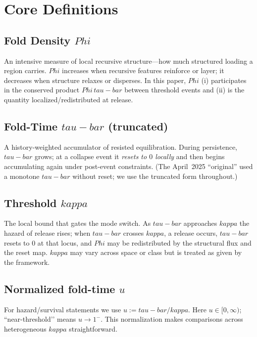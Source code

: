 \documentclass[12pt]{article}
\newcommand{\FoldDensity}{\Phi}
\newcommand{\FoldTime}{\bar{\tau}}
\newcommand{\Threshold}{\kappa}
\def\FoldDensity{Phi}%
\def\FoldTime{tau-bar}%
\def\Threshold{kappa}%
\def\bar#1{#1}%
\begin{document}
\section{Core Definitions}

\subsection[Fold Density (Phi)]{Fold Density $\FoldDensity$}
An intensive measure of local recursive structure—how much structured loading a region carries.
$\FoldDensity$ increases when recursive features reinforce or layer; it decreases when structure relaxes or disperses.
In this paper, $\FoldDensity$ (i) participates in the conserved product $\FoldDensity\,\FoldTime$ between threshold events and
(ii) is the quantity localized/redistributed at release.

\subsection[Fold-Time (tau-bar), truncated]{Fold-Time $\FoldTime$ (truncated)}
A history-weighted accumulator of resisted equilibration.
During persistence, $\FoldTime$ grows; at a collapse event it \emph{resets to $0$ locally} and then begins accumulating again under post-event constraints.
(The April~2025 “original” used a monotone $\FoldTime$ without reset; we use the truncated form throughout.)

\subsection[Threshold (kappa)]{Threshold $\Threshold$}
The local bound that gates the mode switch.
As $\FoldTime$ approaches $\Threshold$ the hazard of release rises; when $\FoldTime$ crosses $\Threshold$, a release occurs,
$\FoldTime$ resets to $0$ at that locus, and $\FoldDensity$ may be redistributed by the structural flux and the reset map.
$\Threshold$ may vary across space or class but is treated as given by the framework.

\subsection[Normalized fold-time (u)]{Normalized fold-time $u$}
For hazard/survival statements we use $u := \FoldTime/\Threshold$.
Here $u\in[0,\infty)$; “near-threshold’’ means $u\to 1^{-}$.
This normalization makes comparisons across heterogeneous $\Threshold$ straightforward.
\end{document}
